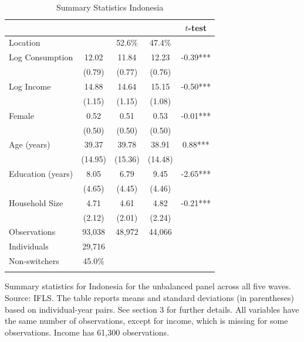 \begin{table}[htbp] \centering \caption{Summary Statistics Indonesia}\label{tab:summary_stats_IDN_unb_3waves} \begin{threeparttable} \begin{tabular}{l cccc} \toprule
 &  &  &  & $t$-test \\
\midrule
Location &  &   52.6\% &   47.4\% &  \\  \addlinespace \addlinespace
Log Consumption & 12.02 & 11.84 & 12.23 & -0.39*** \\
 & (0.79) & (0.77) & (0.76) &  \\  \addlinespace
Log Income & 14.88 & 14.64 & 15.15 & -0.50*** \\
 & (1.15) & (1.15) & (1.08) &  \\  \addlinespace
Female & 0.52 & 0.51 & 0.53 & -0.01*** \\
 & (0.50) & (0.50) & (0.50) &  \\  \addlinespace
Age (years) & 39.37 & 39.78 & 38.91 & 0.88*** \\
 & (14.95) & (15.36) & (14.48) &  \\  \addlinespace
Education (years) & 8.05 & 6.79 & 9.45 & -2.65*** \\
 & (4.65) & (4.45) & (4.46) &  \\  \addlinespace
Household Size & 4.71 & 4.61 & 4.82 & -0.21*** \\
 & (2.12) & (2.01) & (2.24) &  \\  \addlinespace


\cmidrule{2-5}
Observations & 93,038 & 48,972 & 44,066 &  \\  \addlinespace
Individuals & 29,716 &  &  &  \\
Non-switchers &   45.0\% &  &  &  \\  \addlinespace
\bottomrule \end{tabular} \begin{tablenotes}[flushleft] \footnotesize \item{Summary statistics for Indonesia for the unbalanced panel across all five waves. Source: IFLS. The table reports means and standard deviations (in parentheses) based on individual-year pairs. See section 3 for further details. All variables have the same number of observations, except for income, which is missing for some observations. Income has 61,300 observations.} \end{tablenotes} \end{threeparttable} \end{table}